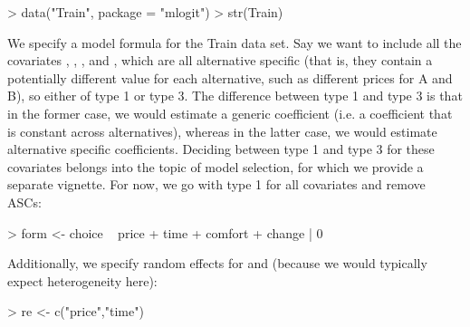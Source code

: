 \documentclass[article]{jss}
\begin{document}
\begin{Schunk}
\begin{Sinput}
> data("Train", package = "mlogit")
> str(Train)
\end{Sinput}
\end{Schunk}

We specify a model formula for the Train data set. Say we want to include all the covariates , , , and , which are all alternative specific (that is, they contain a potentially different value for each alternative, such as different prices for A and B), so either of type 1 or type 3. The difference between type 1 and type 3 is that in the former case, we would estimate a generic coefficient (i.e. a coefficient that is constant across alternatives), whereas in the latter case, we would estimate alternative specific coefficients. Deciding between type 1 and type 3 for these covariates belongs into the topic of model selection, for which we provide a separate vignette. For now, we go with type 1 for all covariates and remove ASCs:

\begin{Schunk}
\begin{Sinput}
> form <- choice ~ price + time + comfort + change | 0
\end{Sinput}
\end{Schunk}

Additionally, we specify random effects for  and  (because we would typically expect heterogeneity here):

\begin{Schunk}
\begin{Sinput}
> re <- c("price","time")
\end{Sinput}
\end{Schunk}
\end{document}
